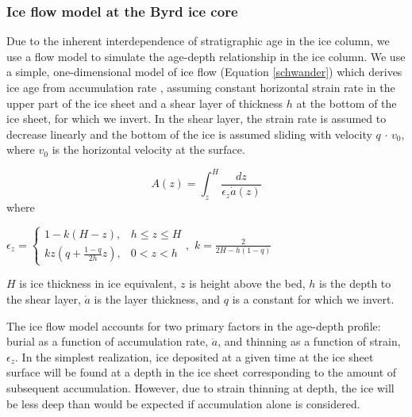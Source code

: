 \subsubsection{Ice flow model at the Byrd ice core}

Due to the inherent interdependence of stratigraphic age in the ice column, we use a flow model to simulate the age-depth relationship in the ice column. We use a simple, one-dimensional model of ice flow (Equation \ref{schwander}) which derives ice age from accumulation rate \citep{schwander2001}, assuming constant horizontal strain rate in the upper part of the ice sheet and a shear layer of thickness $h$ at the bottom of the ice sheet, for which we invert. In the shear layer, the strain rate is assumed to decrease linearly and the bottom of the ice is assumed sliding with velocity $q$ $\cdot$ $v_0$, where $v_0$ is the horizontal velocity at the surface.

\begin{equation}\label{schwander}
A(z) = \int_{z}^{H} \frac{dz}{\epsilon_z \dot{a}(z)}
\end{equation}
where
\begin{center}
$    \epsilon_z=
    \begin{cases}
                 1-k(H-z), & h \leq z \leq H \\
                  kz(q+\frac{1-q}{2h}z), & 0 < z < h
    \end{cases}, 
$
$
k = \frac{2}{2H - h(1-q)}
$
\end{center}
$H$ is ice thickness in ice equivalent, $z$ is height above the bed, $h$ is the depth to the shear layer, $\dot{a}$ is the layer thickness, and $q$ is a constant for which we invert. 

The ice flow model accounts for two primary factors in the age-depth profile: burial as a function of accumulation rate, $\dot{a}$, and thinning as a function of strain, $\epsilon_z$. In the simplest realization, ice deposited at a given time at the ice sheet surface will be found at a depth in the ice sheet corresponding to the amount of subsequent accumulation. However, due to strain thinning at depth, the ice will be less deep than would be expected if accumulation alone is considered. 

